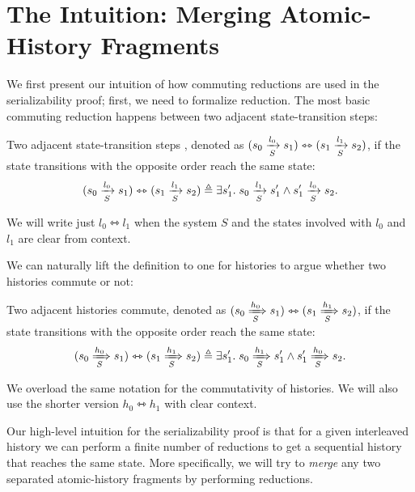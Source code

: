 \section{The Intuition: Merging Atomic-History Fragments}
\label{sec-sz-pf-intuition}

\newcommand{\commstep}[2]{\ensuremath{#1 \leftrightarrowtriangle #2}}
\newcommand{\commhst}[2]{\ensuremath{#1 \leftrightarrowtriangle #2}}

We first present our intuition of how commuting reductions are used in the serializability proof; first, we need to formalize reduction.
The most basic commuting reduction happens between two adjacent state-transition steps:
\begin{definition}
  \label{def-comm-steps}
  Two adjacent state-transition steps , denoted as \commstep{(\semstep{S}{s_0}{l_0}{s_1})}{(\semstep{S}{s_1}{l_1}{s_2})}, if the state transitions with the opposite order reach the same state:
  \begin{displaymath}
    \commstep{(\semstep{S}{s_0}{l_0}{s_1})}{(\semstep{S}{s_1}{l_1}{s_2})} \triangleq \exists s_1'.\; \semstep{S}{s_0}{l_1}{s_1'} \wedge \semstep{S}{s_1'}{l_0}{s_2}.
  \end{displaymath}
\end{definition}
We will write just $\commstep{l_0}{l_1}$ when the system $S$ and the states involved with $l_0$ and $l_1$ are clear from context.

We can naturally lift the definition to one for histories to argue whether two histories commute or not:
\begin{definition}
  \label{def-comm-hsts}
  Two adjacent histories commute, denoted as \commhst{(\semsteps{S}{s_0}{h_0}{s_1})}{(\semsteps{S}{s_1}{h_1}{s_2})}, if the state transitions with the opposite order reach the same state:
  \begin{displaymath}
    \commhst{(\semsteps{S}{s_0}{h_0}{s_1})}{(\semsteps{S}{s_1}{h_1}{s_2})} \triangleq \exists s_1'.\; \semsteps{S}{s_0}{h_1}{s_1'} \wedge \semsteps{S}{s_1'}{h_0}{s_2}.
  \end{displaymath}
\end{definition}
We overload the same notation for the commutativity of histories.
We will also use the shorter version $\commhst{h_0}{h_1}$ with clear context.

Our high-level intuition for the serializability proof is that for a given interleaved history we can perform a finite number of reductions to get a sequential history that reaches the same state.
More specifically, we will try to \emph{merge} any two separated atomic-history fragments by performing reductions.

